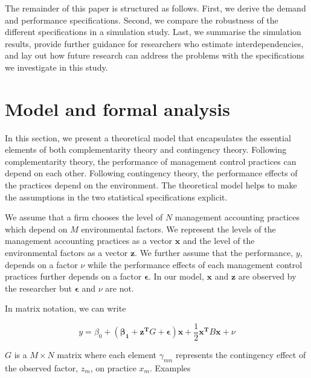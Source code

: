 \documentclass[12pt]{article}
\begin{document}
The remainder of this paper is structured as follows. First, we derive
the demand and performance specifications. Second, we compare the
robustness of the different specifications in a simulation study. Last,
we summarise the simulation results, provide further guidance for
researchers who estimate interdependencies, and lay out how future
research can address the problems with the specifications we investigate
in this study.

\section{Model and formal analysis}\label{model-and-formal-analysis}

In this section, we present a theoretical model that encapsulates
the essential elements of both complementarity theory and contingency
theory. Following complementarity theory, the performance of management
control practices can depend on each other. Following contingency
theory, the performance effects of the practices depend on the
environment. The theoretical model helps to make the assumptions in the
two statistical specifications explicit. 

We assume that a firm chooses the level of $N$ management accounting practices which depend on $M$ environmental factors. We represent the levels of the management accounting practices as a vector $\mathbf{x}$ and the level of the environmental factors as a vector $\mathbf{z}$. We further assume that the performance, $y$, depends on a factor $\nu$ while the performance effects of each management control practices further depends on a factor $\mathbf{\epsilon}$. In our model, $\mathbf{x}$ and $\mathbf{z}$ are observed by the researcher but $\mathbf{\epsilon}$ and $\nu$ are not. 


In matrix notation, we can write

\begin{equation} \label{eq:structural-matrix}
y = \beta_0 + (\mathbf{\beta_1} + \mathbf{z^T} G + \mathbf{\epsilon})
     \mathbf{x} + \frac{1}{2}\mathbf{x^T} B \mathbf{x} + \nu
\end{equation}

$G$ is a $M \times N$ matrix where each element $\gamma_{mn}$ represents the contingency effect of the observed factor, $z_m$, on practice $x_m$. Examples
\end{document}
